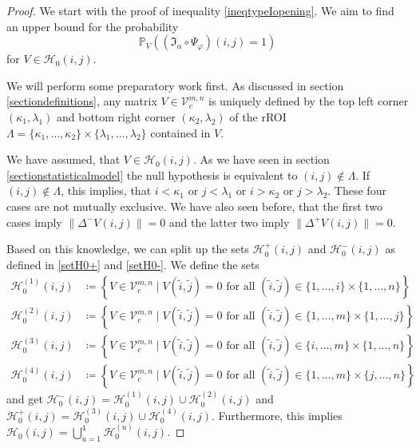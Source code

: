 \documentclass[a4paper,12pt]{article}
\newcommand{\norm}[1]{\lVert#1\rVert}
\theoremstyle{plain}
\theoremstyle{definition}
\begin{document}
\begin{proof}
	We start with the proof of inequality \eqref{ineqtypeIopening}. We aim to find an upper bound for the probability
	\begin{equation*}
		\mathbb{P}_V( (\mathfrak{I}_\alpha \circ \Psi_\varphi)(i, j) = 1 )
	\end{equation*}
	for $V \in \mathcal{H}_0(i, j)$.
	
	We will perform some preparatory work first. As discussed in section \ref{sectiondefinitions}, any matrix $V \in \mathcal{V}_c^{m, n}$ is uniquely defined by the top left corner $(\kappa_1, \lambda_1)$ and bottom right corner $(\kappa_2, \lambda_2)$ of the rROI $\varLambda = \{ \kappa_1, \dots, \kappa_2 \} \times \{ \lambda_1, \dots, \lambda_2 \}$ contained in $V$.
	
	We have assumed, that $V \in \mathcal{H}_0(i, j)$. As we have seen in section \ref{sectionstatisticalmodel} the null hypothesis is equivalent to $(i, j) \notin \varLambda$. If $(i, j) \notin \varLambda$, this implies, that $i < \kappa_1$ or $j < \lambda_1$ or $i > \kappa_2$ or $j > \lambda_2$. These four cases are not mutually exclusive. We have also seen before, that the first two cases imply $\norm{\Delta^- V(i, j)} = 0$ and the latter two imply $\norm{\Delta^+ V(i, j)} = 0$.
	
	Based on this knowledge, we can split up the sets $\mathcal{H}_0^+(i, j)$ and $\mathcal{H}_0^-(i, j)$ as defined in \eqref{setH0+} and \eqref{setH0-}. We define the sets
	\begin{align*}
		\mathcal{H}_0^{(1)}(i, j) &\coloneqq \left\{ V \in \mathcal{V}_c^{m, n} \mid V(\tilde{i}, \tilde{j}) = 0 \textrm{ for all } (\tilde{i}, \tilde{j}) \in \{ 1, \dots, i \} \times \{ 1, \dots, n \} \right\} \\
		\mathcal{H}_0^{(2)}(i, j) &\coloneqq \left\{ V \in \mathcal{V}_c^{m, n} \mid V(\tilde{i}, \tilde{j}) = 0 \textrm{ for all } (\tilde{i}, \tilde{j}) \in \{ 1, \dots, m \} \times \{ 1, \dots, j \} \right\} \\
		\mathcal{H}_0^{(3)}(i, j) &\coloneqq \left\{ V \in \mathcal{V}_c^{m, n} \mid V(\tilde{i}, \tilde{j}) = 0 \textrm{ for all } (\tilde{i}, \tilde{j}) \in \{ i, \dots, m \} \times \{ 1, \dots, n \} \right\} \\
		\mathcal{H}_0^{(4)}(i, j) &\coloneqq \left\{ V \in \mathcal{V}_c^{m, n} \mid V(\tilde{i}, \tilde{j}) = 0 \textrm{ for all } (\tilde{i}, \tilde{j}) \in \{ 1, \dots, m \} \times \{ j, \dots, n \} \right\}
	\end{align*}
	and get $\mathcal{H}_0^-(i, j) = \mathcal{H}_0^{(1)}(i, j) \cup \mathcal{H}_0^{(2)}(i, j)$ and $\mathcal{H}_0^+(i, j) = \mathcal{H}_0^{(3)}(i, j) \cup \mathcal{H}_0^{(4)}(i, j)$. Furthermore, this implies $\mathcal{H}_0(i, j) = \bigcup_{u = 1}^4 \mathcal{H}_0^{(u)}(i, j)$.
	

\end{proof}
\end{document}
